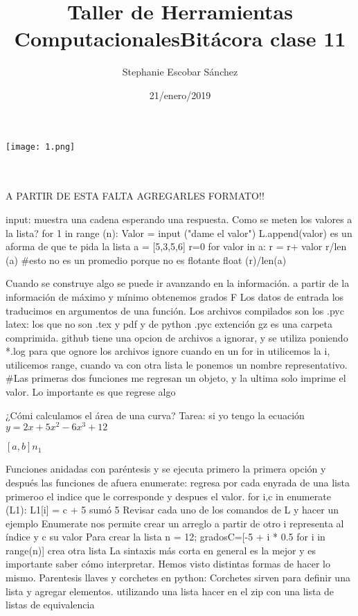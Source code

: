 \documentclass{article}
\title{\Huge Taller de Herramientas Computacionales}
\author{Stephanie Escobar Sánchez}
\date{21/enero/2019}
\begin{document}
	\maketitle
\begin{center}
	\texttt{[image: 1.png]}	
\end{center}
\newpage
\title{\Huge Bitácora clase 11} \\
\\

A PARTIR DE ESTA FALTA AGREGARLES FORMATO!!

input: muestra una cadena esperando una respuesta.
Como se meten los valores a la lista?
for 1 in range (n):
	Valor = input ("dame el valor")
	L.append(valor)
es un aforma de que te pida la lista 
a = [5,3,5,6]
r=0
for valor in a:
r = r+ valor
r/len (a) \#esto no es un promedio porque no es flotante
float (r)/len(a) 
	

Cuando se construye algo se puede ir avanzando en la información. 
a partir de la información de máximo y mínimo obtenemos grados F
Los datos de entrada los traducimos en argumentos de una función.
Los archivos compilados son los .pyc
latex: los que no son .tex y pdf y de python .pyc
extención gz es una carpeta comprimida. github tiene una opcion de archivos a ignorar, y se utiliza poniendo *.log para que ognore los archivos ignore 
cuando en un for in utilicemos la i, utilicemos range, cuando va con otra lista le ponemos un nombre representativo.
\#Las primeras dos funciones me regresan un objeto, y la ultima solo imprime el valor. Lo importante es que regrese algo

¿Cómi calculamos el área de una curva?
Tarea: si yo tengo la ecuación $y= 2x+5x^{2}-6x^{3}+12$

$[a,b] n_{1} $

Funciones anidadas con paréntesis y se ejecuta primero la primera opción  y después las funciones de afuera
enumerate: regresa por cada enyrada de una lista primeroo el indice que le corresponde y despues el valor.
for i,c in enumerate (L1):
L1[i] = c + 5
sumó 5 
Revisar cada uno de los comandos de L y hacer un ejemplo
Enumerate nos permite crear un arreglo a partir de otro i representa al índice y c su valor
Para crear la lista n = 12; gradosC=[-5 + i * 0.5 for i in range(n)] crea otra lista 
La sintaxis más corta en general es la mejor y es importante saber cómo interpretar. Hemos visto distintas formas de hacer lo mismo.
Parentesis llaves y corchetes en python: Corchetes sirven para definir una lista y agregar elementos.
utilizando una lista hacer en el zip con una lista de listas de equivalencia
\end{document}
